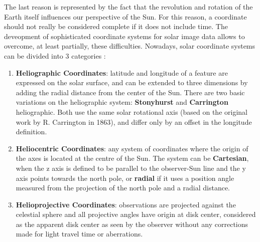 \bigbreak
\noindent The last reason is represented by the fact that the revolution and rotation of the Earth itself influences our perspective of the Sun. For this reason, a coordinate should not really be considered complete if it does not include time. The deveopment of sophisticated coordinate systems for solar image data allows to overcome, at least partially, these difficulties. Nowadays, solar coordinate systems can be divided into 3 categories \cite{thompson2006coordinate}:
\begin{enumerate}
  \item \textbf{Heliographic Coordinates}: latitude and longitude of a feature are expressed on the solar surface, and can be extended to three dimensions by adding the radial distance from the center of the Sun. There are two basic variations on the heliographic system: \textbf{Stonyhurst} and \textbf{Carrington} heliographic. Both use the same solar rotational axis (based on the original work by R. Carrington in 1863), and differ only by an offset in the longitude definition.
  \item \textbf{Heliocentric Coordinates}: any system of coordinates where the origin of the axes is located at the centre of the Sun. The system can be \textbf{Cartesian}, when the z axis is defined to be parallel to the observer-Sun line and the y axis points towards the north pole, or \textbf{radial} if it uses a position angle measured from the projection of the north pole and a radial distance.
  \item \textbf{Helioprojective Coordinates}: observations are projected against the celestial sphere and all projective angles have origin at disk center, considered as the apparent disk center as seen by the observer without any corrections made for light travel time or aberrations.
\end{enumerate}



%
%

